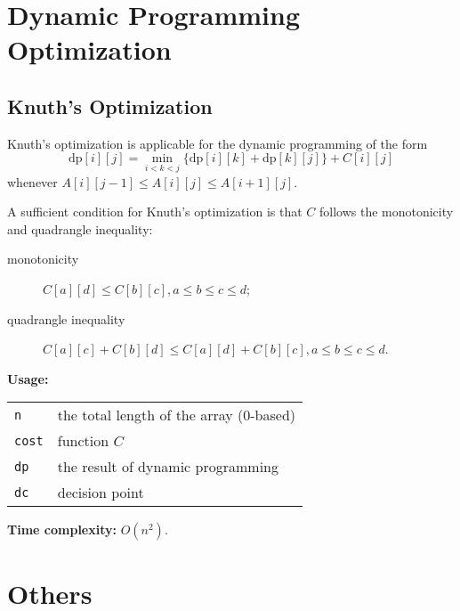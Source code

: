 \section{Dynamic Programming Optimization}

\subsection{Knuth's Optimization}
Knuth's optimization is applicable for the dynamic programming of the form
$$\mathrm{dp}[i][j] = \min_{i < k < j} \{\mathrm{dp}[i][k] + \mathrm{dp}[k][j]\} + C[i][j]$$
whenever $A[i][j-1] \leq A[i][j] \leq A[i+1][j]$.

A sufficient condition for Knuth's optimization is that $C$ follows the monotonicity and quadrangle inequality:

\begin{description}
  \item[monotonicity] $C[a][d] \leq C[b][c], a \leq b \leq c \leq d$;
  \item[quadrangle inequality] $C[a][c] + C[b][d] \leq C[a][d] + C[b][c], a \leq b \leq c \leq d$.
\end{description}

\textbf{Usage:} \\[0.1cm]
\begin{tabular}{p{2cm} p{9.5cm}}
  \lstinline|n| & the total length of the array (0-based) \\
  \lstinline|cost| & function $C$ \\
  \lstinline|dp| & the result of dynamic programming \\
  \lstinline|dc| & decision point
\end{tabular} \par
\textbf{Time complexity:} $O(n^2)$. \par


\section{Others}
